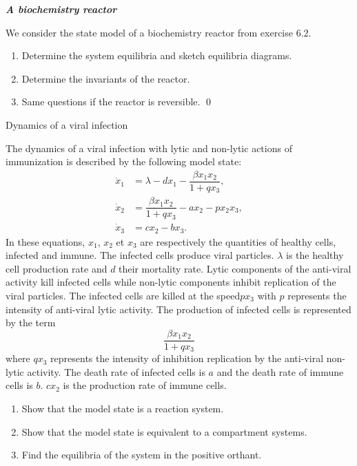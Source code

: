 \begin{exercice}{\bf \em A biochemistry reactor}

We consider the state model of a biochemistry reactor from exercise 6.2.
\begin{enumerate}
\item Determine the system equilibria and sketch equilibria diagrams.
\item Determine the invariants of the reactor.
\item Same questions if the reactor is reversible. \qed
\end{enumerate}
\end{exercice}
\vv

\begin{exercice}{Dynamics of a viral infection}

The dynamics of a viral infection with lytic and non-lytic actions of immunization  is described by the following model state:
\begin{equation*} \begin{split}
\dot x_1 &= \lambda - dx_1 - \dfrac{\beta x_1 x_2}{1 + q x_3}, \\
\dot x_2 &= \dfrac{\beta x_1 x_2}{1 + q x_3} - a x_2 - p x_2 x_3, \\
\dot x_3 &= c x_2 - b x_3.
\end{split} \end{equation*}
In these equations, $x_1$, $x_2$ et $x_3$ are respectively the quantities of healthy cells, infected and immune. The infected cells produce viral particles. $\lambda$ is the healthy cell production rate and $d$ their mortality rate. Lytic components of the anti-viral activity kill infected cells while non-lytic components inhibit replication of the viral particles. The infected cells are killed at the speed$p x_3$ with $p$ represents the intensity of anti-viral lytic activity. The production of infected cells is represented by the term
$$
\dfrac{\beta x_1 x_2}{1 + q x_3}
$$
where $q x_3$ represents the intensity of inhibition replication by the anti-viral non-lytic activity. The death rate of infected cells is $a$ and the death rate of immune cells is $b$. $c x_2$ is the production rate of immune cells.
\begin{enumerate}
\item Show that the model state is a reaction system.
\item Show that the model state is equivalent to a compartment systems.
\item Find the equilibria of the system in the positive orthant.
\end{enumerate}
\end{exercice}
\vv


